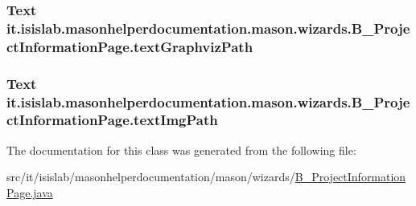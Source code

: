 \hypertarget{classit_1_1isislab_1_1masonhelperdocumentation_1_1mason_1_1wizards_1_1_b___project_information_page_a7aefdf9fbb7f43f9b7d2a8175e7128e7}{
\subsubsection[{text\-Graphviz\-Path}]{\setlength{\rightskip}{0pt plus 5cm}Text it.\-isislab.\-masonhelperdocumentation.\-mason.\-wizards.\-B\-\_\-\-Project\-Information\-Page.\-text\-Graphviz\-Path\hspace{0.3cm}{\ttfamily [private]}}}\label{classit_1_1isislab_1_1masonhelperdocumentation_1_1mason_1_1wizards_1_1_b___project_information_page_a7aefdf9fbb7f43f9b7d2a8175e7128e7}
\hypertarget{classit_1_1isislab_1_1masonhelperdocumentation_1_1mason_1_1wizards_1_1_b___project_information_page_a2d8d332de830585ce52efe2c43ff9e2b}{
\subsubsection[{text\-Img\-Path}]{\setlength{\rightskip}{0pt plus 5cm}Text it.\-isislab.\-masonhelperdocumentation.\-mason.\-wizards.\-B\-\_\-\-Project\-Information\-Page.\-text\-Img\-Path\hspace{0.3cm}{\ttfamily [private]}}}\label{classit_1_1isislab_1_1masonhelperdocumentation_1_1mason_1_1wizards_1_1_b___project_information_page_a2d8d332de830585ce52efe2c43ff9e2b}


The documentation for this class was generated from the following file\-:\begin{DoxyCompactItemize}
\item 
src/it/isislab/masonhelperdocumentation/mason/wizards/\hyperlink{_b___project_information_page_8java}{B\-\_\-\-Project\-Information\-Page.\-java}\end{DoxyCompactItemize}
